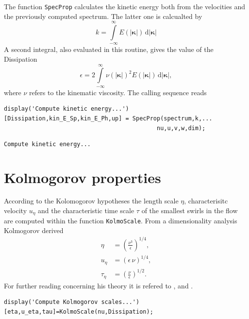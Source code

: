 \documentclass[preprint,12pt,ntfdMod]{elsarticle}
\begin{document}
\begin{par}

  The function \lstinline!SpecProp! calculates the kinetic energy both
  from the velocities and the previously computed spectrum. The latter
  one is calcualted by
  \begin{equation}
      k = \int\limits_{-\infty}^{\infty} E(|\boldsymbol\kappa|)\,\mathrm{d}|\boldsymbol\kappa|
  \end{equation}
  A second integral, also evaluated in this routine, gives the value
  of the Dissipation
  \begin{equation}
      \epsilon = 2\int\limits_{-\infty}^{\infty}\nu(|\boldsymbol\kappa|)^2
      E(|\boldsymbol\kappa|)\,\mathrm{d}|\boldsymbol\kappa|,
  \end{equation}
  where $\nu$ refers to the kinematic viscosity.
  The calling sequence reads

\end{par} \vspace{1em}
\begin{verbatim}
display('Compute kinetic energy...')
[Dissipation,kin_E_Sp,kin_E_Ph,up] = SpecProp(spectrum,k,...
                                            nu,u,v,w,dim);
\end{verbatim}

        \color{lightgray} \begin{verbatim}Compute kinetic energy...
\end{verbatim} \color{black}
    \begin{par}



\end{par} \vspace{1em}


\section{Kolmogorov properties}

\begin{par}

According to the Kolomogorov hypotheses the length scale $\eta$,
characterisitc velocity $u_{\eta}$ and the characteristic time scale
$\tau$ of the smallest swirls in the flow are computed
within the function \lstinline!KolmoScale!. From a dimensionality
analysis Kolmogorov derived
  \begin{eqnarray}
      \eta&=\displaystyle\left(\frac{\nu^3}{\epsilon}\right)^{1/4},\\
      u_{\eta}&=\left(\epsilon\,\nu\right)^{1/4},\\
      \tau_{\eta}&=\displaystyle\left(\frac{\nu}{\epsilon}\right)^{1/2}.
  \end{eqnarray}
For further reading concerning his theory it is refered to
\citet{Pope:2000tp}, \citet{Hinze:1975tb} and \citet{Tennekes:1972vb}.

\end{par} \vspace{1em}
\begin{verbatim}
display('Compute Kolmogorov scales...')
[eta,u_eta,tau]=KolmoScale(nu,Dissipation);
\end{verbatim}
\end{document}
